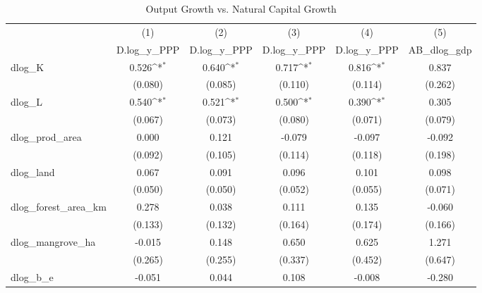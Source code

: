 \begin{table}[htbp]\centering
\def\sym#1{\ifmmode^{#1}\else\(^{#1}\)\fi}
\caption{Output Growth vs. Natural Capital Growth}
\begin{tabular}{l*{5}{c}}
\hline\hline
            &\multicolumn{1}{c}{(1)}&\multicolumn{1}{c}{(2)}&\multicolumn{1}{c}{(3)}&\multicolumn{1}{c}{(4)}&\multicolumn{1}{c}{(5)}\\
            &\multicolumn{1}{c}{D.log\_y\_PPP}&\multicolumn{1}{c}{D.log\_y\_PPP}&\multicolumn{1}{c}{D.log\_y\_PPP}&\multicolumn{1}{c}{D.log\_y\_PPP}&\multicolumn{1}{c}{AB\_dlog\_gdp}\\
\hline
dlog\_K      &       0.526\sym{*}&       0.640\sym{*}&       0.717\sym{*}&       0.816\sym{*}&       0.837       \\
            &     (0.080)       &     (0.085)       &     (0.110)       &     (0.114)       &     (0.262)       \\
[1em]
dlog\_L      &       0.540\sym{*}&       0.521\sym{*}&       0.500\sym{*}&       0.390\sym{*}&       0.305       \\
            &     (0.067)       &     (0.073)       &     (0.080)       &     (0.071)       &     (0.079)       \\
[1em]
dlog\_prod\_area&       0.000       &       0.121       &      -0.079       &      -0.097       &      -0.092       \\
            &     (0.092)       &     (0.105)       &     (0.114)       &     (0.118)       &     (0.198)       \\
[1em]
dlog\_land   &       0.067       &       0.091       &       0.096       &       0.101       &       0.098       \\
            &     (0.050)       &     (0.050)       &     (0.052)       &     (0.055)       &     (0.071)       \\
[1em]
dlog\_forest\_area\_km&       0.278       &       0.038       &       0.111       &       0.135       &      -0.060       \\
            &     (0.133)       &     (0.132)       &     (0.164)       &     (0.174)       &     (0.166)       \\
[1em]
dlog\_mangrove\_ha&      -0.015       &       0.148       &       0.650       &       0.625       &       1.271       \\
            &     (0.265)       &     (0.255)       &     (0.337)       &     (0.452)       &     (0.647)       \\
[1em]
dlog\_b\_e    &      -0.051       &       0.044       &       0.108       &      -0.008       &      -0.280       \\

\end{tabular}
\end{table}
